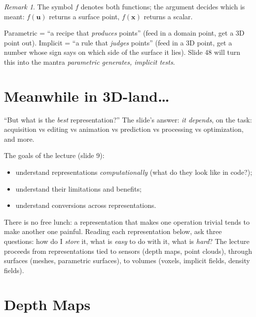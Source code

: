 \documentclass[11pt,a4paper]{article}
\newcommand{\vx}{\bm{x}}
\newcommand{\vu}{\bm{u}}
\theoremstyle{definition}
\theoremstyle{plain}
\theoremstyle{remark}
\newtheorem{remark}[definition]{Remark}
\begin{document}
\begin{remark}
The symbol $f$ denotes both functions; the argument decides which is meant: $f(\vu)$ returns a surface point, $f(\vx)$ returns a scalar.
\end{remark}

\begin{intuition}
Parametric = ``a recipe that \emph{produces} points'' (feed in a domain point, get a 3D point out). Implicit = ``a rule that \emph{judges} points'' (feed in a 3D point, get a number whose sign says on which side of the surface it lies). Slide 48 will turn this into the mantra \emph{parametric generates, implicit tests}.
\end{intuition}

\section{Meanwhile in 3D-land\dots\ }

``But what is the \emph{best} representation?'' The slide's answer: \emph{it depends}, on the task: acquisition vs editing vs animation vs prediction vs processing vs optimization, and more.

The goals of the lecture (slide 9):
\begin{itemize}[nosep]
\item understand representations \emph{computationally} (what do they look like in code?);
\item understand their limitations and benefits;
\item understand conversions across representations.
\end{itemize}

\begin{intuition}
There is no free lunch: a representation that makes one operation trivial tends to make another one painful. Reading each representation below, ask three questions: how do I \emph{store} it, what is \emph{easy} to do with it, what is \emph{hard}?
The lecture proceeds from representations tied to sensors (depth maps, point clouds), through surfaces (meshes, parametric surfaces), to volumes (voxels, implicit fields, density fields).
\end{intuition}

\section{Depth Maps }
\end{document}
